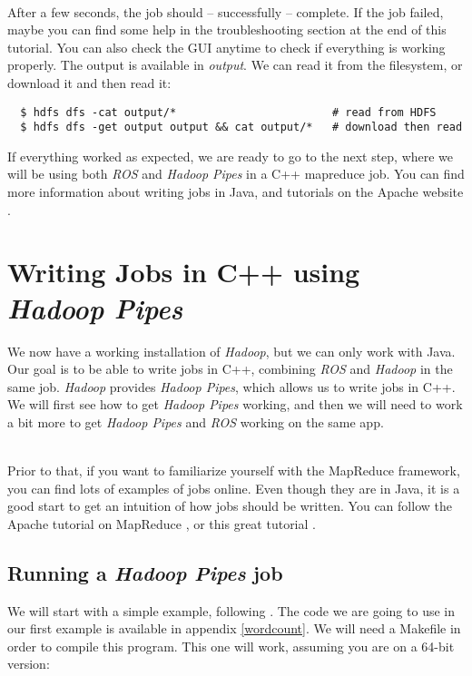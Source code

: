 \documentclass[a4paper, 12pt]{article}
\begin{document}
~\\
After a few seconds, the job should -- successfully -- complete. If the job failed, maybe you can find some help in the troubleshooting section at the end of this tutorial. You can also check the GUI anytime to check if everything is working properly. The output is available in \textit{output}. We can read it from the filesystem, or download it and then read it:

\begin{verbatim}
  $ hdfs dfs -cat output/*                        # read from HDFS
  $ hdfs dfs -get output output && cat output/*   # download then read
\end{verbatim}

If everything worked as expected, we are ready to go to the next step, where we will be using both \textit{ROS} and \textit{Hadoop Pipes} in a C++ mapreduce job. You can find more information about writing jobs in Java, and tutorials on the Apache website \cite{hadoop_mapreduce_tutorial}.

\section{Writing Jobs in C++ using \textit{Hadoop Pipes}}

We now have a working installation of \textit{Hadoop}, but we can only work with Java. Our goal is to be able to write jobs in C++, combining \textit{ROS} and \textit{Hadoop} in the same job. \textit{Hadoop} provides \textit{Hadoop Pipes}, which allows us to write jobs in C++. We will first see how to get \textit{Hadoop Pipes} working, and then we will need to work a bit more to get \textit{Hadoop Pipes} and \textit{ROS} working on the same app. 

~\\
Prior to that, if you want to familiarize yourself with the MapReduce framework, you can find lots of examples of jobs online. Even though they are in Java, it is a good start to get an intuition of how jobs should be written. You can follow the Apache tutorial on MapReduce \cite{hadoop_mapreduce_tutorial}, or this great tutorial \cite{slideshare_tuto}.

  \subsection{Running a \textit{Hadoop Pipes} job}
  
We will start with a simple example, following \cite{smith_pipes}. The code we are going to use in our first example is available in appendix \ref{wordcount}. We will need a Makefile in order to compile this program. This one will work, assuming you are on a 64-bit version:
\end{document}
